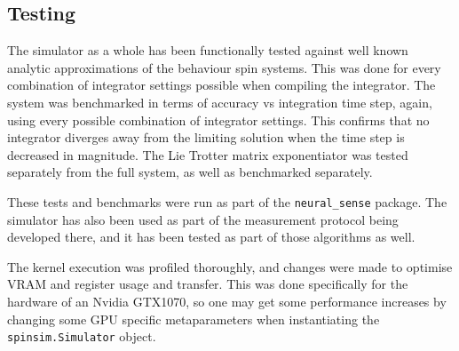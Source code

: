\documentclass{jors}
\begin{document}

	\subsection*{Testing}
		The simulator as a whole has been functionally tested against well known analytic approximations of the behaviour spin systems. This was done for every combination of integrator settings possible when compiling the integrator. The system was benchmarked in terms of accuracy vs integration time step, again, using every possible combination of integrator settings. This confirms that no integrator diverges away from the limiting solution when the time step is decreased in magnitude. The Lie Trotter matrix exponentiator was tested separately from the full system, as well as benchmarked separately.

		These tests and benchmarks were run as part of the \texttt{neural\_sense} package. The simulator has also been used as part of the measurement protocol being developed there, and it has been tested as part of those algorithms as well.

		The kernel execution was profiled thoroughly, and changes were made to optimise VRAM and register usage and transfer. This was done specifically for the hardware of an Nvidia GTX1070, so one may get some performance increases by changing some GPU specific metaparameters when instantiating the \texttt{spinsim.Simulator} object.
\end{document}
